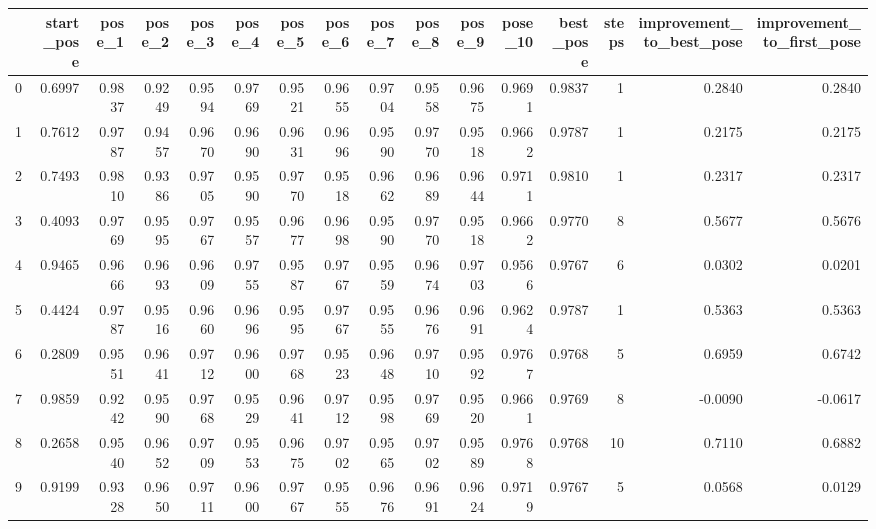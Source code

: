 \begin{tabular}{lrrrrrrrrrrrrrrr}
\toprule
{} &  start\_pose &  pose\_1 &  pose\_2 &  pose\_3 &  pose\_4 &  pose\_5 &  pose\_6 &  pose\_7 &  pose\_8 &  pose\_9 &  pose\_10 &  best\_pose &  steps &  improvement\_to\_best\_pose &  improvement\_to\_first\_pose \\
\midrule
0  &      0.6997 &  0.9837 &  0.9249 &  0.9594 &  0.9769 &  0.9521 &  0.9655 &  0.9704 &  0.9558 &  0.9675 &   0.9691 &     0.9837 &      1 &                    0.2840 &                     0.2840 \\
1  &      0.7612 &  0.9787 &  0.9457 &  0.9670 &  0.9690 &  0.9631 &  0.9696 &  0.9590 &  0.9770 &  0.9518 &   0.9662 &     0.9787 &      1 &                    0.2175 &                     0.2175 \\
2  &      0.7493 &  0.9810 &  0.9386 &  0.9705 &  0.9590 &  0.9770 &  0.9518 &  0.9662 &  0.9689 &  0.9644 &   0.9711 &     0.9810 &      1 &                    0.2317 &                     0.2317 \\
3  &      0.4093 &  0.9769 &  0.9595 &  0.9767 &  0.9557 &  0.9677 &  0.9698 &  0.9590 &  0.9770 &  0.9518 &   0.9662 &     0.9770 &      8 &                    0.5677 &                     0.5676 \\
4  &      0.9465 &  0.9666 &  0.9693 &  0.9609 &  0.9755 &  0.9587 &  0.9767 &  0.9559 &  0.9674 &  0.9703 &   0.9566 &     0.9767 &      6 &                    0.0302 &                     0.0201 \\
5  &      0.4424 &  0.9787 &  0.9516 &  0.9660 &  0.9696 &  0.9595 &  0.9767 &  0.9555 &  0.9676 &  0.9691 &   0.9624 &     0.9787 &      1 &                    0.5363 &                     0.5363 \\
6  &      0.2809 &  0.9551 &  0.9641 &  0.9712 &  0.9600 &  0.9768 &  0.9523 &  0.9648 &  0.9710 &  0.9592 &   0.9767 &     0.9768 &      5 &                    0.6959 &                     0.6742 \\
7  &      0.9859 &  0.9242 &  0.9590 &  0.9768 &  0.9529 &  0.9641 &  0.9712 &  0.9598 &  0.9769 &  0.9520 &   0.9661 &     0.9769 &      8 &                   -0.0090 &                    -0.0617 \\
8  &      0.2658 &  0.9540 &  0.9652 &  0.9709 &  0.9553 &  0.9675 &  0.9702 &  0.9565 &  0.9702 &  0.9589 &   0.9768 &     0.9768 &     10 &                    0.7110 &                     0.6882 \\
9  &      0.9199 &  0.9328 &  0.9650 &  0.9711 &  0.9600 &  0.9767 &  0.9555 &  0.9676 &  0.9691 &  0.9624 &   0.9719 &     0.9767 &      5 &                    0.0568 &                     0.0129 \\

\end{tabular}
